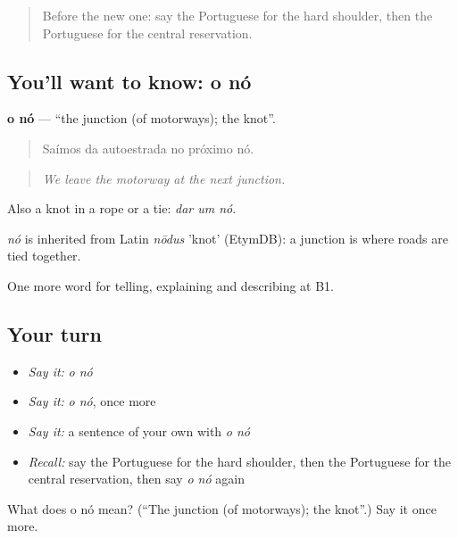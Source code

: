 \begin{quote}
Before the new one: say the Portuguese for the hard shoulder, then the Portuguese for the central reservation.
\end{quote}

\subsection*{You'll want to know: o nó}
\textbf{o nó} — \textquotedblleft{}the junction (of motorways); the knot\textquotedblright{}.

\begin{quote}
Saímos da autoestrada no próximo nó.
\end{quote}

\begin{quote}
\emph{We leave the motorway at the next junction.}
\end{quote}

Also a knot in a rope or a tie: \emph{dar um nó}.

\begin{cousinweb}
\emph{nó} is inherited from Latin \emph{nōdus} 'knot' (EtymDB): a junction is where roads are tied together.
\end{cousinweb}

\begin{grammarlens}[title={What you've built}]
One more word for telling, explaining and describing at B1.
\end{grammarlens}

\subsection*{Your turn}
\begin{itemize}
\raggedright
  \item \emph{Say it:} \emph{o nó}
  \item \emph{Say it:} \emph{o nó}, once more
  \item \emph{Say it:} a sentence of your own with \emph{o nó}
  \item \emph{Recall:} say the Portuguese for the hard shoulder, then the Portuguese for the central reservation, then say \emph{o nó} again
\end{itemize}

\begin{tcolorbox}[breakable,colback=teal!4,colframe=teal!35!black,title={Before you move on}]
What does o nó mean? (\textquotedblleft{}The junction (of motorways); the knot\textquotedblright{}.) Say it once more.
\end{tcolorbox}

